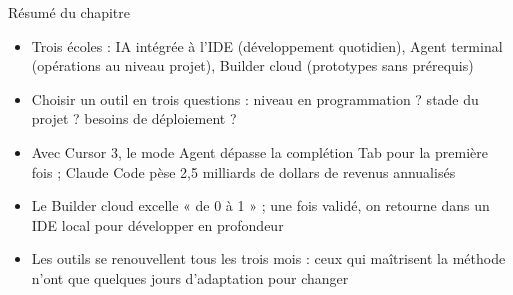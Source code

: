 \begin{tcbsummary}{Résumé du chapitre}
\begin{itemize}
  \item Trois écoles : IA intégrée à l'IDE (développement quotidien), Agent terminal (opérations au niveau projet), Builder cloud (prototypes sans prérequis)
  \item Choisir un outil en trois questions : niveau en programmation ? stade du projet ? besoins de déploiement ?
  \item Avec Cursor 3, le mode Agent dépasse la complétion Tab pour la première fois ; Claude Code pèse 2,5 milliards de dollars de revenus annualisés
  \item Le Builder cloud excelle « de 0 à 1 » ; une fois validé, on retourne dans un IDE local pour développer en profondeur
  \item Les outils se renouvellent tous les trois mois : ceux qui maîtrisent la méthode n'ont que quelques jours d'adaptation pour changer
\end{itemize}

\end{tcbsummary}
